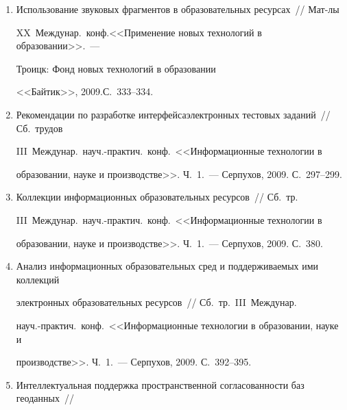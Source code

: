 \begin{enumerate}[1.]
\item {}


Использование звуковых фрагментов в образовательных ресурсах~// Мат-лы 


XX~Междунар.\ конф.\linebreak <<Применение новых технологий в образовании>>.~--- 


Троицк: Фонд новых технологий в образовании 


<<Байтик>>, 2009.\linebreak С.~333--334.





\item {}


 Рекомендации по разработке интерфейса\linebreak электронных тестовых заданий~// Сб.\ трудов 


III~Междунар.\ науч.-практич.\ конф.\ <<Информационные технологии в 


образовании, науке и производстве>>. Ч.~1.~---  Серпухов, 2009.  С.~297--299.





\item {}


Коллекции информационных образовательных ресурсов~//  Сб.\ тр.\ 


III~Междунар.\ науч.-практич.\ конф.\ <<Информационные технологии в 


образовании, науке и производстве>>. Ч.~1.~---  Серпухов, 2009. С.~380.





\item {}


Анализ информационных образовательных сред и поддерживаемых ими коллекций 


электронных образовательных ресурсов~// Сб.\ тр.\ III~Междунар.\ 


науч.-практич.\ конф.\ <<Информационные технологии в образовании, науке и 


производстве>>. Ч.~1.~--- Серпухов, 2009. С.~392--395.





\item {}


Интеллектуальная поддержка пространственной согласованности баз геоданных~// 



\end{enumerate}
